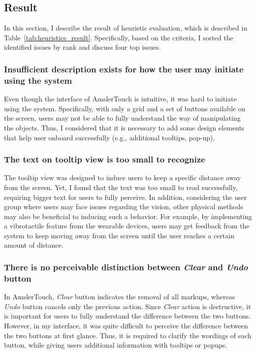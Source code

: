 \subsection{Result}

In this section, I describe the result of heuristic evaluation, which is described in Table~\ref{tab:heuristics_result}. Specifically, based on the criteria, I sorted the identified issues by rank and discuss four top issues.

\subsubsection{Insufficient description exists for how the user may initiate using the system}

Even though the interface of AmslerTouch is intuitive, it was hard to initiate using the system. Specifically, with only a grid and a set of buttons available on the screen, users may not be able to fully understand the way of manipulating the objects. Thus, I considered that it is necessary to add some design elements that help user onboard successfully (e.g., additional tooltips, pop-up).

\subsubsection{The text on tooltip view is too small to recognize}
The tooltip view was designed to induce users to keep a specific distance away from the screen. Yet, I found that the text was too small to read successfully, requiring bigger text for users to fully perceive. In addition, considering the user group where users may face issues regarding the vision, other physical methods may also be beneficial to inducing such a behavior. For example, by implementing a vibrotactile feature from the wearable devices, users may get feedback from the system to keep moving away from the screen until the user reaches a certain amount of distance.

\subsubsection{There is no perceivable distinction between \textit{Clear} and \textit{Undo} button}

In AmslerTouch, \textit{Clear} button indicates the removal of all markups, whereas \textit{Undo} button cancels only the previous action. Since \textit{Clear} action is destructive, it is important for users to fully understand the difference between the two buttons. However, in my interface, it was quite difficult to perceive the difference between the two buttons at first glance. Thus, it is required to clarify the wordings of each button, while giving users additional information with tooltips or popups.

